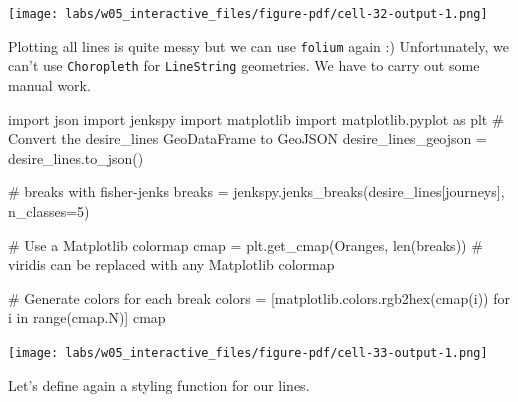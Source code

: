 \documentclass[
  letterpaper,
  DIV=11,
  numbers=noendperiod]{scrreprt}
\newenvironment{Shaded}{\begin{snugshade}}{\end{snugshade}}
\newcommand{\BuiltInTok}[1]{\textcolor[rgb]{0.00,0.23,0.31}{#1}}
\newcommand{\CommentTok}[1]{\textcolor[rgb]{0.37,0.37,0.37}{#1}}
\newcommand{\ControlFlowTok}[1]{\textcolor[rgb]{0.00,0.23,0.31}{#1}}
\newcommand{\DecValTok}[1]{\textcolor[rgb]{0.68,0.00,0.00}{#1}}
\newcommand{\ImportTok}[1]{\textcolor[rgb]{0.00,0.46,0.62}{#1}}
\newcommand{\KeywordTok}[1]{\textcolor[rgb]{0.00,0.23,0.31}{#1}}
\newcommand{\NormalTok}[1]{\textcolor[rgb]{0.00,0.23,0.31}{#1}}
\newcommand{\OperatorTok}[1]{\textcolor[rgb]{0.37,0.37,0.37}{#1}}
\newcommand{\StringTok}[1]{\textcolor[rgb]{0.13,0.47,0.30}{#1}}
\begin{document}
\texttt{[image: labs/w05\_interactive\_files/figure-pdf/cell-32-output-1.png]}

Plotting all lines is quite messy but we can use \texttt{folium} again
:) Unfortunately, we can't use \texttt{Choropleth} for
\texttt{LineString} geometries. We have to carry out some manual work.

\begin{Shaded}
\begin{Highlighting}[]
\ImportTok{import}\NormalTok{ json}
\ImportTok{import}\NormalTok{ jenkspy}
\ImportTok{import}\NormalTok{ matplotlib}
\ImportTok{import}\NormalTok{ matplotlib.pyplot }\ImportTok{as}\NormalTok{ plt}
\CommentTok{\# Convert the desire\_lines GeoDataFrame to GeoJSON}
\NormalTok{desire\_lines\_geojson }\OperatorTok{=}\NormalTok{ desire\_lines.to\_json()}

\CommentTok{\# breaks with fisher{-}jenks}
\NormalTok{breaks }\OperatorTok{=}\NormalTok{ jenkspy.jenks\_breaks(desire\_lines[}\StringTok{\textquotesingle{}journeys\textquotesingle{}}\NormalTok{], n\_classes}\OperatorTok{=}\DecValTok{5}\NormalTok{)}

\CommentTok{\# Use a Matplotlib colormap}
\NormalTok{cmap }\OperatorTok{=}\NormalTok{ plt.get\_cmap(}\StringTok{\textquotesingle{}Oranges\textquotesingle{}}\NormalTok{, }\BuiltInTok{len}\NormalTok{(breaks))  }\CommentTok{\# \textquotesingle{}viridis\textquotesingle{} can be replaced with any Matplotlib colormap}

\CommentTok{\# Generate colors for each break}
\NormalTok{colors }\OperatorTok{=}\NormalTok{ [matplotlib.colors.rgb2hex(cmap(i)) }\ControlFlowTok{for}\NormalTok{ i }\KeywordTok{in} \BuiltInTok{range}\NormalTok{(cmap.N)]}
\NormalTok{cmap}
\end{Highlighting}
\end{Shaded}

\texttt{[image: labs/w05\_interactive\_files/figure-pdf/cell-33-output-1.png]}

Let's define again a styling function for our lines.
\end{document}
